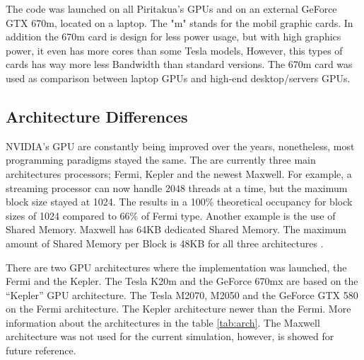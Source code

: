   The code was launched on all Piritakua's GPUs and on an external GeForce GTX 670m, located on a laptop. The "m" stands for the mobil graphic cards. In addition the 670m card is design for less power usage, but with high graphics power, it even has more cores than some Tesla models, However, this types of cards has way more less Bandwidth than standard versions. The 670m card was used as comparison between laptop GPUs and high-end desktop/servers GPUs.
     
\subsection{Architecture Differences}

  NVIDIA's GPU are constantly being improved over the years, nonetheless, most programming paradigms stayed the same. The are currently three main architectures processors; Fermi, Kepler and the newest Maxwell. For example, a streaming processor can now handle 2048 threads at a time, but the maximum block size stayed at 1024. The results in a 100$\%$ theoretical occupancy for block sizes of 1024 compared to 66$\%$ of Fermi type. Another example is the use of Shared Memory. Maxwell has 64KB dedicated Shared Memory. The maximum amount of Shared Memory per Block is 48KB for all three architectures \cite{hoermanngpu}.
  
  There are two GPU architectures where the implementation was launched, the Fermi and the Kepler. The Tesla K20m and the GeForce 670mx are based on the ``Kepler'' GPU architecture. The Tesla M2070, M2050 and the GeForce GTX 580 on the Fermi architecture. The Kepler architecture newer than the Fermi. More information about the architectures in the table \ref{tab:arch}. The Maxwell architecture was not used for the current simulation, however, is showed for future reference.
  
